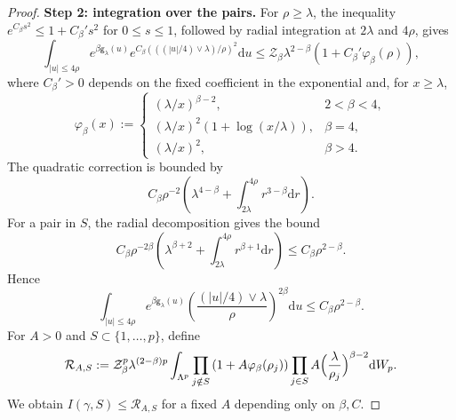 \documentclass[a4paper,10pt,leqno]{amsart}
\numberwithin{equation}{section}
\newcommand{\dd}{\mathrm{d}}
\def\mc{\mathcal}
\def\g{\mathsf{g}}
\begin{document}
\begin{proof}
  \smallskip
  \noindent
  \textbf{Step 2: integration over the pairs.}
  For $\rho\ge\lambda$, the inequality
  $e^{C_\beta s^2}\le1+C_\beta' s^2$ for $0\le s\le1$, followed by radial integration at $2\lambda$ and $4\rho$, gives
  \begin{equation}\label{align1}
    \int_{|u|\le4\rho}e^{\beta\g_\lambda(u)}
    e^{C_\beta(((|u|/4)\vee\lambda)/\rho)^2}\dd u
    \le\mc Z_\beta\lambda^{2-\beta}\left(1+C_\beta'\varphi_\beta(\rho)\right),
  \end{equation}
  where $C_\beta'>0$ depends on the fixed coefficient in the exponential and, for $x\ge\lambda$,
  \begin{equation}\label{defvarphi}
    \varphi_\beta(x):=\begin{cases}
      (\lambda/x)^{\beta-2},&2<\beta<4,\\
      (\lambda/x)^2(1+\log(x/\lambda)),&\beta=4,\\
      (\lambda/x)^2,&\beta>4.
    \end{cases}
  \end{equation}
  The quadratic correction is bounded by
  \[
    C_\beta\rho^{-2}
    \left(\lambda^{4-\beta}+\int_{2\lambda}^{4\rho}r^{3-\beta}\dd r\right).
  \]
  For a pair in $S$, the radial decomposition gives the bound
  \[
    C_\beta\rho^{-2\beta}\left(\lambda^{\beta+2}
    +\int_{2\lambda}^{4\rho}r^{\beta+1}\dd r\right)
    \le C_\beta\rho^{2-\beta}.
  \]
  Hence
  \begin{equation}\label{align2}
    \int_{|u|\le4\rho}e^{\beta\g_\lambda(u)}
    \left(\frac{(|u|/4)\vee\lambda}{\rho}\right)^{2\beta}\dd u
    \le C_\beta\rho^{2-\beta}.
  \end{equation}
  For $A>0$ and $S\subset\{1,\ldots,p\}$, define
  \begin{equation}\label{pred3}
    \mathcal R_{A,S}:=
    \mc Z_\beta^p\lambda^{(2-\beta)p}\int_{\Lambda^p}
    \prod_{j\notin S}\left(1+A\varphi_\beta(\rho_j)\right)
    \prod_{j\in S}A\Bigl(\frac{\lambda}{\rho_j}\Bigr)^{\beta-2}\dd W_p.
  \end{equation}
  We obtain $I(\gamma,S)\le\mathcal R_{A,S}$ for a fixed $A$ depending only on $\beta,C$.


\end{proof}
\end{document}
